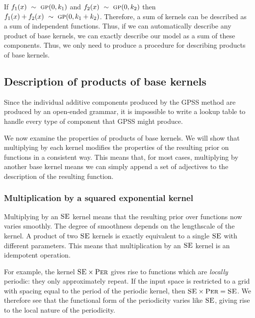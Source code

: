\documentclass{article} %
\begin{document}
If $f_1(x) \ \sim\  {\textsc{gp}}{}(0, k_1)$ and $f_2(x) \ \sim\  {\textsc{gp}}{}(0, k_2)$ then $f_1(x) + f_2(x) \ \sim\  {\textsc{gp}}{}(0, k_1 + k_2)$.
Therefore, a sum of kernels can be described as a sum of independent functions.
%
Thus, if we can automatically describe any product of base kernels, we can exactly describe our model as a sum of these components.  Thus, we only need to produce a procedure for describing products of base kernels.

\subsection{Description of products of base kernels}
\vspace{-0.08in}

Since the individual additive components produced by the GPSS method are produced by an open-ended grammar, it is impossible to write a lookup table to handle every type of component that GPSS might produce.  



We now examine the properties of products of base kernels.
We will show that multiplying by each kernel modifies the properties of the resulting prior on functions in a consistent way. 
This means that, for most cases, multiplying by another base kernel means we can simply append a set of adjectives to the description of the resulting function.

\subsubsection{Multiplication by a squared exponential kernel}
\vspace{-0.08in}

Multiplying by an ${\textsc{SE}}$ kernel means that the resulting prior over functions now varies smoothly.
The degree of smoothness depends on the lengthscale of the kernel.
A product of two ${\textsc{SE}}$ kernels is exactly equivalent to a single ${\textsc{SE}}$ with different parameters.
This means that multiplication by an ${\textsc{SE}}$ kernel is an idempotent operation.  

For example,
the kernel ${\textsc{SE}} \times {\textsc{Per}}$ gives rise to functions which are \emph{locally} periodic: they only approximately repeat.
If the input space is restricted to a grid with spacing equal to the period of the periodic kernel, then ${\textsc{SE}} \times {\textsc{Per}} = {\textsc{SE}}$.
We therefore see that the functional form of the periodicity varies like ${\textsc{SE}}$, giving rise to the local nature of the periodicity.
\end{document}
